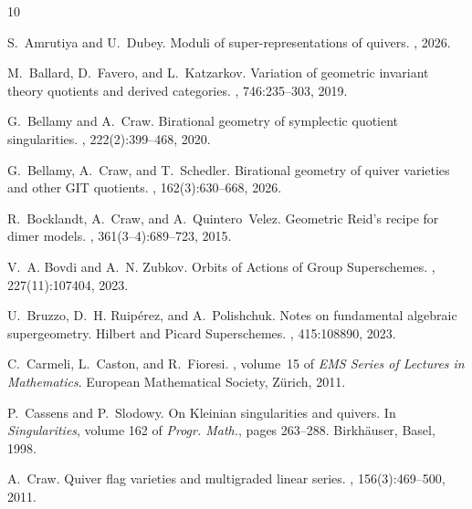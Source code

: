 \documentclass[11pt,a4paper,reqno,noamsfonts]{amsart}
\numberwithin{equation}{section}
\theoremstyle{definition}
\theoremstyle{remark}
\begin{document}


\begin{thebibliography}{10}

S.~Amrutiya and U.~Dubey.
\newblock Moduli of super-representations of quivers. 
, 2026.

M.~Ballard, D.~Favero, and L.~Katzarkov.
\newblock Variation of geometric invariant theory quotients and derived
  categories.
, 746:235--303, 2019.

G.~Bellamy and A.~Craw.
\newblock Birational geometry of symplectic quotient singularities.
, 222(2):399--468, 2020.

G.~Bellamy, A.~Craw, and T.~Schedler.
\newblock Birational geometry of quiver varieties and other {GIT} quotients.
, 162(3):630--668, 2026.

R.~Bocklandt, A.~Craw, and A.~Quintero~Velez.
\newblock Geometric {R}eid's recipe for dimer models.
, 361(3--4):689--723, 2015.

V.~A. Bovdi and A.~N. Zubkov.
\newblock Orbits of {A}ctions of {G}roup {S}uperschemes.
, 227(11):107404, 2023.

U.~Bruzzo, D.~H. Ruip{\'e}rez, and A.~Polishchuk.
\newblock Notes on fundamental algebraic supergeometry. {H}ilbert and {P}icard
  {S}uperschemes.
, 415:108890, 2023.

C.~Carmeli, L.~Caston, and R.~Fioresi.
, volume~15 of
  {\em EMS Series of Lectures in Mathematics}.
\newblock European Mathematical Society, Z{\"u}rich, 2011.

P.~Cassens and P.~Slodowy.
\newblock On {K}leinian singularities and quivers.
\newblock In {\em Singularities}, volume 162 of {\em Progr. Math.}, pages
  263--288. Birkh{\"a}user, Basel, 1998.

A.~Craw.
\newblock Quiver flag varieties and multigraded linear series.
, 156(3):469--500, 2011.


\end{thebibliography}
\end{document}
